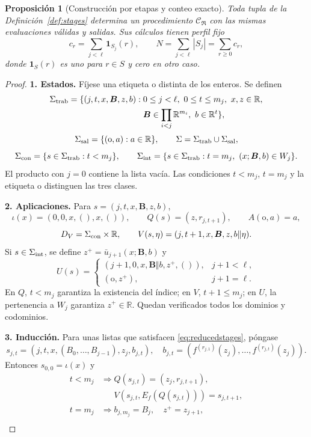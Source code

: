 \documentclass[11pt,a4paper]{article}
\numberwithin{equation}{section}
\newtheorem{proposition}[theorem]{Proposición}
\theoremstyle{definition}
\theoremstyle{remark}
\newcommand{\R}{\mathbb R}
\newcommand{\paso}[1]{\par\smallskip\noindent\textbf{#1}\quad}
\begin{document}
\begin{proposition}[Construcción por etapas y conteo exacto]\label{prop:stages}
Toda tupla de la Definición~\ref{def:stages} determina un procedimiento $\mathscr C_{\mathfrak R}$ con las mismas evaluaciones válidas y salidas. Sus cálculos tienen perfil fijo
\[
c_r=\sum_{j<\ell}\mathbf1_{S_j}(r),\qquad
N=\sum_{j<\ell}|S_j|=\sum_{r\ge0}c_r,
\]
donde $\mathbf1_S(r)$ es uno para $r\in S$ y cero en otro caso.
\end{proposition}
\begin{proof}
\paso{1. Estados.}
Fíjese una etiqueta $\mathrm{o}$ distinta de los enteros. Se definen
\begin{align*}
\Sigma_{\rm trab}=\{(j,t,x,\boldsymbol B,z,b):\;&0\le j<\ell,\ 0\le t\le m_j,\ x,z\in\R,\\
&\boldsymbol B\in\prod_{i<j}\R^{m_i},\ b\in\R^t\},
\end{align*}
\[
\Sigma_{\rm sal}=\{(\mathrm{o},a):a\in\R\},\qquad
\Sigma=\Sigma_{\rm trab}\cup\Sigma_{\rm sal},
\]
\[
\Sigma_{\rm con}=\{s\in\Sigma_{\rm trab}:t<m_j\},\qquad
\Sigma_{\rm int}=\{s\in\Sigma_{\rm trab}:t=m_j,\ (x;\boldsymbol B,b)\in W_j\}.
\]
El producto con $j=0$ contiene la lista vacía. Las condiciones $t<m_j$, $t=m_j$ y la etiqueta $\mathrm{o}$ distinguen las tres clases.
\paso{2. Aplicaciones.}
Para $s=(j,t,x,\boldsymbol B,z,b)$,
\[
\iota(x)=(0,0,x,(),x,()),\qquad Q(s)=(z,r_{j,t+1}),\qquad A(\mathrm{o},a)=a,
\]
\[
D_V=\Sigma_{\rm con}\times\R,\qquad
V(s,\eta)=(j,t+1,x,\boldsymbol B,z,b\Vert\eta).
\]
Si $s\in\Sigma_{\rm int}$, se define $z^+=\bar u_{j+1}(x;\boldsymbol B,b)$ y
\[
U(s)=\begin{cases}
(j+1,0,x,\boldsymbol B\Vert b,z^+,()),&j+1<\ell,\\
(\mathrm{o},z^+),&j+1=\ell.
\end{cases}
\]
En $Q$, $t<m_j$ garantiza la existencia del índice; en $V$, $t+1\le m_j$; en $U$, la pertenencia a $W_j$ garantiza $z^+\in\R$. Quedan verificados todos los dominios y codominios.
\paso{3. Inducción.}
Para unas listas que satisfacen \eqref{eq:reducedstages}, póngase
\[
s_{j,t}=(j,t,x,(B_0,\ldots,B_{j-1}),z_j,b_{j,t}),\quad
b_{j,t}=(f^{(r_{j,1})}(z_j),\ldots,f^{(r_{j,t})}(z_j)).
\]
Entonces $s_{0,0}=\iota(x)$ y
\begin{align*}
t<m_j&\Longrightarrow Q(s_{j,t})=(z_j,r_{j,t+1}),\\
&\phantom{\Longrightarrow}V(s_{j,t},E_f(Q(s_{j,t})))=s_{j,t+1},\\
t=m_j&\Longrightarrow b_{j,m_j}=B_j,\quad z^+=z_{j+1},\\

\end{align*}
\end{proof}
\end{document}

